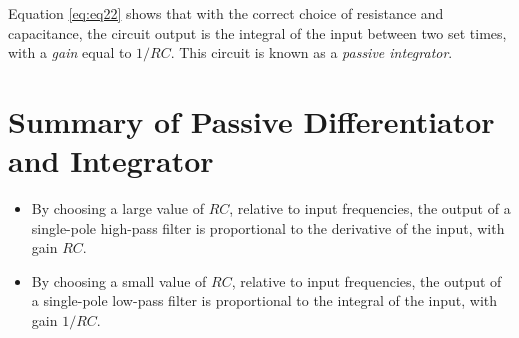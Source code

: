 \documentclass[12pt]{article}
\begin{document}
Equation \ref{eq:eq22} shows that with the correct choice of resistance and capacitance, the circuit output is the integral of the input between two set times, with a \textit{gain} equal to $1/RC$.  This circuit is known as a \textit{passive integrator}.

\section{Summary of Passive Differentiator and Integrator}

\begin{itemize}
\item By choosing a large value of $RC$, relative to input frequencies, the output of a single-pole high-pass filter is proportional to the derivative of the input, with gain $RC$.
\item By choosing a small value of $RC$, relative to input frequencies, the output of a single-pole low-pass filter is proportional to the integral of the input, with gain $1/RC$.
\end{itemize}
\end{document}
